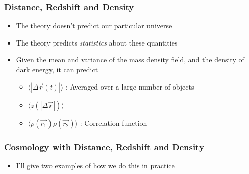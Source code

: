 \documentclass{beamer}
\begin{document}
\frame
{

    \frametitle{Distance, Redshift and Density}


    \begin{itemize}

        \item The theory doesn't predict our particular universe

        \item The theory predicts {\em statistics} about these quantities
            
        \item Given the mean and variance of the mass density field, and the
            density of dark energy, it can predict

            \begin{itemize}

                \item {\color{gold} $\langle |\Delta \vec{r} (t)| \rangle$ }: Averaged
                    over a large number of objects

                \item {\color{gold} $\langle z(|\Delta \vec{r}|) \rangle$}

                \item {\color{gold} $\langle \rho(\vec{r_1}) \rho(\vec{r_2})
                    \rangle$ }: Correlation function

            \end{itemize}

    \end{itemize}

}

\frame
{

    \frametitle{Cosmology with Distance, Redshift and Density}


    \begin{itemize}

        \item I'll give two examples of how we do this in practice


    \end{itemize}

}
\end{document}
